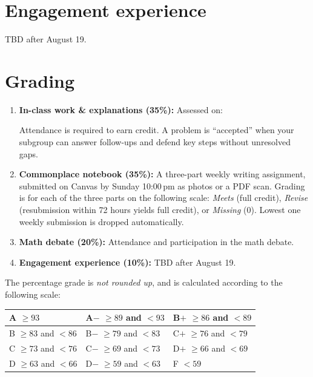 \documentclass[oneside,11pt]{amsart}
\begin{document}
\section{Engagement experience}

TBD after August 19.

\section{Grading}

\begin{enumerate}[$\bullet$]
\item \textbf{In-class work \& explanations (35\%):}
Assessed on:
Attendance is required to earn credit. A problem is ``accepted'' when your subgroup can answer follow-ups and defend key steps without unresolved gaps.

 \item \textbf{Commonplace notebook (35\%):}
	A three-part weekly writing assignment, submitted
	on Canvas by Sunday 10:00\,pm as photos or a PDF scan. 
	Grading is for each of the three parts on the following scale:
	\emph{Meets} (full credit), 
	\emph{Revise} 
	(resubmission within 72 hours yields full credit), or
	\emph{Missing} (0).
	Lowest one weekly submission is dropped
	automatically.

  \item \textbf{Math debate (20\%):}
	Attendance and participation in the math debate.

	\item \textbf{Engagement experience (10\%):}
	TBD after August 19.
\end{enumerate}

The percentage grade is \emph{not rounded up}, and is calculated 
according to the following scale:
\begin{center}
\begin{tabular}{l|l|l}
A $\ge 93$ & A$-$ $\ge 89$ and $< 93$ & B$+$ $\ge 86$ and $< 89$ \\\hline
B $\ge 83$ and $< 86$ & B$-$ $\ge 79$ and $< 83$ & C$+$ $\ge 76$ and $< 79$ \\\hline
C $\ge 73$ and $< 76$ & C$-$ $\ge 69$ and $< 73$ & D$+$ $\ge 66$ and $< 69$ \\\hline
D $\ge 63$ and $< 66$ & D$-$ $\ge 59$ and $< 63$ & F $< 59$
\end{tabular}
\end{center}
\end{document}
